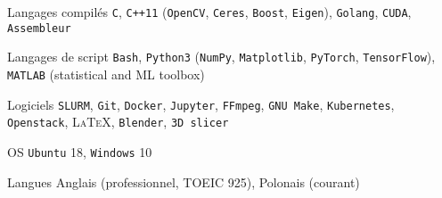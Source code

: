 


\begin{cvskills}


\cvskill
{Langages compilés} %
{\texttt{C}, \texttt{C++11} (\texttt{OpenCV}, \texttt{Ceres}, \texttt{Boost}, \texttt{Eigen}), \texttt{Golang}, \texttt{CUDA}, \texttt{Assembleur}} %


\cvskill
{Langages de script} %
{\texttt{Bash}, \texttt{Python3} (\texttt{NumPy}, \texttt{Matplotlib}, \texttt{PyTorch}, \texttt{TensorFlow}), \texttt{MATLAB} (statistical and ML toolbox)} %


\cvskill
{Logiciels} %
{\texttt{SLURM}, \texttt{Git}, \texttt{Docker}, \texttt{Jupyter},  \texttt{FFmpeg}, \texttt{GNU Make}, \texttt{Kubernetes}, \texttt{Openstack}, \textsc{\LaTeX}, \texttt{Blender}, \texttt{3D slicer}} %


\cvskill
{OS} %
{\texttt{Ubuntu} 18, \texttt{Windows} 10} %


\cvskill
{Langues} %
{Anglais (professionnel, TOEIC 925), Polonais (courant)} %


\end{cvskills}
